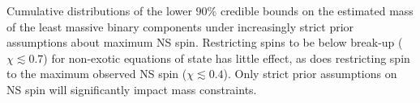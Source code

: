 \label{fig:restricted_priors} Cumulative distributions of the lower $90\%$ credible bounds on the estimated mass of the least massive binary components under increasingly strict prior assumptions about maximum NS spin.  Restricting spins to be below break-up ($\chi\lesssim0.7$) for non-exotic equations of state has little effect, as does restricting spin to the maximum observed NS spin ($\chi\lesssim0.4$).  Only strict prior assumptions on NS spin will significantly impact mass constraints.
  